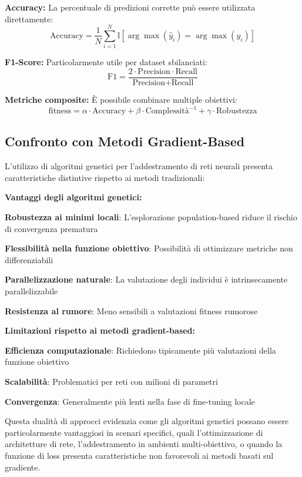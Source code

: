 \textbf{Accuracy:} La percentuale di predizioni corrette può essere utilizzata direttamente:
\[
\text{Accuracy} = \frac{1}{N}\sum_{i=1}^{N}\mathbb{I}[\arg\max(\hat{y}_i) = \arg\max(y_i)]
\]

\textbf{F1-Score:} Particolarmente utile per dataset sbilanciati:
\[
\text{F1} = \frac{2 \cdot \text{Precision} \cdot \text{Recall}}{\text{Precision} + \text{Recall}}
\]

\textbf{Metriche composite:} È possibile combinare multiple obiettivi:
\[
\text{fitness} = \alpha \cdot \text{Accuracy} + \beta \cdot \text{Complessità}^{-1} + \gamma \cdot \text{Robustezza}
\]


\subsection{Confronto con Metodi Gradient-Based}
L'utilizzo di algoritmi genetici per l'addestramento di reti neurali presenta caratteristiche distintive rispetto ai metodi tradizionali:

\textbf{Vantaggi degli algoritmi genetici:}
\begin{compactitemize}
\item \textbf{Robustezza ai minimi locali}: L'esplorazione population-based riduce il rischio di convergenza prematura
\item \textbf{Flessibilità nella funzione obiettivo}: Possibilità di ottimizzare metriche non differenziabili
\item \textbf{Parallelizzazione naturale}: La valutazione degli individui è intrinsecamente parallelizzabile
\item \textbf{Resistenza al rumore}: Meno sensibili a valutazioni fitness rumorose
\end{compactitemize}

\textbf{Limitazioni rispetto ai metodi gradient-based:}
\begin{compactitemize}
\item \textbf{Efficienza computazionale}: Richiedono tipicamente più valutazioni della funzione obiettivo
\item \textbf{Scalabilità}: Problematici per reti con milioni di parametri
\item \textbf{Convergenza}: Generalmente più lenti nella fase di fine-tuning locale
\end{compactitemize}

Questa dualità di approcci evidenzia come gli algoritmi genetici possano essere particolarmente vantaggiosi in scenari specifici, quali l'ottimizzazione di architetture di rete, l'addestramento in ambienti multi-obiettivo, o quando la funzione di loss presenta caratteristiche non favorevoli ai metodi basati sul gradiente.

